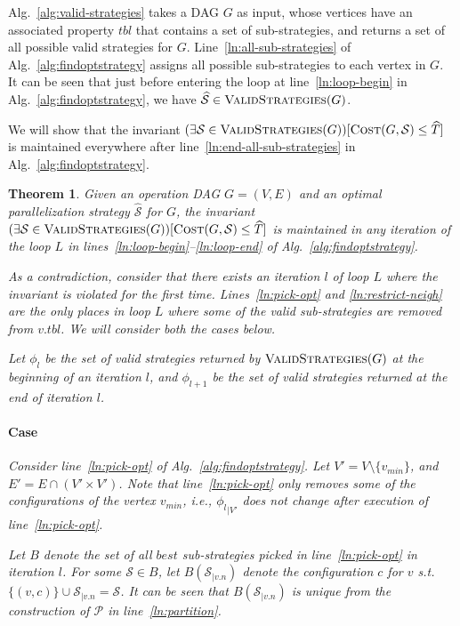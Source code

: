 \documentclass{article}
\newcommand{\rom}[1]{\uppercase\expandafter{\romannumeral #1\relax}}
\newcommand{\strategy}{\mathcal{S}}
\newcommand{\optstrategy}{\widehat{\mathcal{S}}}
\newcommand{\optcost}{\widehat{T}}
\newcommand{\minv}{v_{min}}
\newtheorem{theorem}{Theorem}
\newcommand{\set}[1]{\{#1\}}
\begin{document}
Alg.~\ref{alg:valid-strategies} takes a DAG $G$ as input, whose vertices
have an associated property $tbl$ that contains a set of sub-strategies, and
returns a set of all possible valid strategies for $G$.
Line~\ref{ln:all-sub-strategies} of Alg.~\ref{alg:findoptstrategy} assigns all possible
sub-strategies to each vertex in $G$. It can be seen that just before
entering the loop at line~\ref{ln:loop-begin} in Alg.~\ref{alg:findoptstrategy},
we have $\optstrategy \in \Call{ValidStrategies}{G}$.

We will show that the invariant $(\exists\strategy \in
\Call{ValidStrategies}{G})[\Call{Cost}{G, \strategy} \le \optcost]$ is
maintained everywhere after line~\ref{ln:end-all-sub-strategies} in
Alg.~\ref{alg:findoptstrategy}.

\begin{theorem}\label{thm:optimality}
	Given an operation DAG $G=(V,E)$ and an optimal parallelization strategy
	$\optstrategy$ for $G$,  the invariant $(\exists\strategy \in
	\Call{ValidStrategies}{G})[\Call{Cost}{G, \strategy} \le \optcost]$ is
	maintained in any iteration of the loop $L$ in
	lines~\ref{ln:loop-begin}--\ref{ln:loop-end} of
	Alg.~\ref{alg:findoptstrategy}.

	\proof
	As a contradiction, consider that there exists an iteration $l$ of loop $L$
	where the invariant is violated for the first time. 
	Lines~\ref{ln:pick-opt} and \ref{ln:restrict-neigh} are the only places in
	loop $L$ where some of the valid sub-strategies are removed from $v.tbl$. We
	will consider both the cases below.

	Let $\phi_{l}$ be the set of valid strategies returned by
	$\Call{ValidStrategies}{G}$ at the beginning of an iteration $l$, and
	$\phi_{l+1}$ be the set of valid strategies returned at the end of iteration
	$l$.

	\paragraph{Case \rom{1}}
	Consider line~\ref{ln:pick-opt} of Alg.~\ref{alg:findoptstrategy}.
	Let $V' = V \setminus \set{\minv}$, and $E' = E \cap (V'\times V')$.
	Note that line~\ref{ln:pick-opt} only removes some of the configurations of
	the vertex $\minv$, i.e., ${\phi_l}_{|V'}$ does not change after execution of
	line~\ref{ln:pick-opt}. 

	Let $B$ denote the set of all $best$ sub-strategies picked in
	line~\ref{ln:pick-opt} in iteration $l$. For some $\strategy \in B$,
	let $B(\strategy_{|v.n})$ denote the configuration $c$ for $v$ s.t.
	$\set{(v,c)} \cup \strategy_{|v.n} = \strategy$.
	It can be seen that $B(\strategy_{|v.n})$ is unique from the construction of
	$\mathcal{P}$ in line~\ref{ln:partition}. 
	

\end{theorem}
\end{document}
